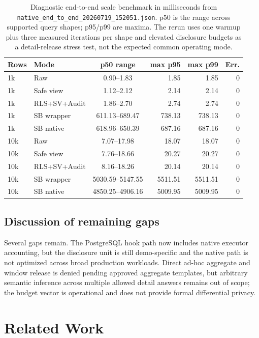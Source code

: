 \documentclass[journal]{IEEEtran}
\begin{document}
\begin{table}[!t]
\centering
\scriptsize
\setlength{\tabcolsep}{3pt}
\caption{Diagnostic end-to-end scale benchmark in milliseconds from
\texttt{native\_end\_to\_end\_20260719\_152051.json}. p50 is the range
across supported query shapes; p95/p99 are maxima. The rerun uses one
warmup plus three measured iterations per shape and elevated disclosure
budgets as a detail-release stress test, not the expected common
operating mode.}
\label{tab:scale-sweep}
\begin{tabular}{@{}llcrrr@{}}
\toprule
Rows & Mode & p50 range & max p95 & max p99 & Err. \\
\midrule
1k & Raw & 0.90--1.83 & 1.85 & 1.85 & 0 \\
1k & Safe view & 1.12--2.12 & 2.14 & 2.14 & 0 \\
1k & RLS+SV+Audit & 1.86--2.70 & 2.74 & 2.74 & 0 \\
1k & SB wrapper & 611.13--689.47 & 738.13 & 738.13 & 0 \\
1k & SB native & 618.96--650.39 & 687.16 & 687.16 & 0 \\
10k & Raw & 7.07--17.98 & 18.07 & 18.07 & 0 \\
10k & Safe view & 7.76--18.66 & 20.27 & 20.27 & 0 \\
10k & RLS+SV+Audit & 8.16--18.26 & 20.14 & 20.14 & 0 \\
10k & SB wrapper & 5030.59--5147.55 & 5511.51 & 5511.51 & 0 \\
10k & SB native & 4850.25--4906.16 & 5009.95 & 5009.95 & 0 \\
\bottomrule
\end{tabular}
\end{table}

\hypertarget{remaining-gaps}{%
\subsection{Discussion of remaining gaps}\label{remaining-gaps}}

Several gaps remain. The PostgreSQL hook path now includes native
executor accounting, but the disclosure unit is still demo-specific and
the native path is not optimized across broad production workloads.
Direct ad-hoc aggregate and window release is denied pending approved
aggregate templates, but arbitrary semantic inference across multiple
allowed detail answers remains out of scope; the budget vector is
operational and does not provide formal differential privacy.

\hypertarget{related-work}{%
\section{Related Work}\label{related-work}}
\end{document}
